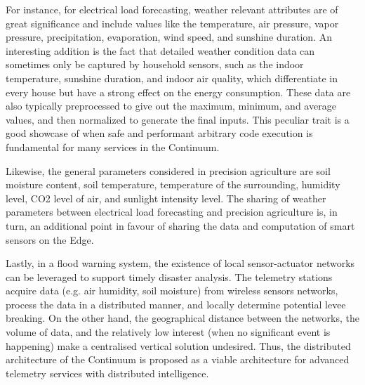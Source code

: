 For instance, for electrical load forecasting, weather relevant attributes are of great significance and include values like the temperature, air pressure, vapor pressure, precipitation, evaporation, wind speed, and sunshine duration. An interesting addition is the fact that detailed weather condition data can sometimes only be captured by household sensors, such as the indoor temperature, sunshine duration, and indoor air quality, which differentiate in every house but have a strong effect on the energy consumption. These data are also typically preprocessed to give out the maximum, minimum, and average values, and then normalized to generate the final inputs. This peculiar trait is a good showcase of when safe and performant arbitrary code execution is fundamental for many services in the Continuum.

Likewise, the general parameters considered in precision agriculture are soil moisture content, soil temperature, temperature of the surrounding, humidity level, CO2 level of air, and sunlight intensity level. The sharing of weather parameters between electrical load forecasting and precision agriculture is, in turn, an additional point in favour of sharing the data and computation of smart sensors on the Edge.

Lastly, in a flood warning system, the existence of local sensor-actuator networks can be leveraged to support timely disaster analysis. The telemetry stations acquire data (e.g. air humidity, soil moisture) from wireless sensors networks, process the data in a distributed manner, and locally determine potential levee breaking. On the other hand, the geographical distance between the networks, the volume of data, and the relatively low interest (when no significant event is happening) make a centralised vertical solution undesired. Thus, the distributed architecture of the Continuum is proposed as a viable architecture for advanced telemetry services with distributed intelligence.

